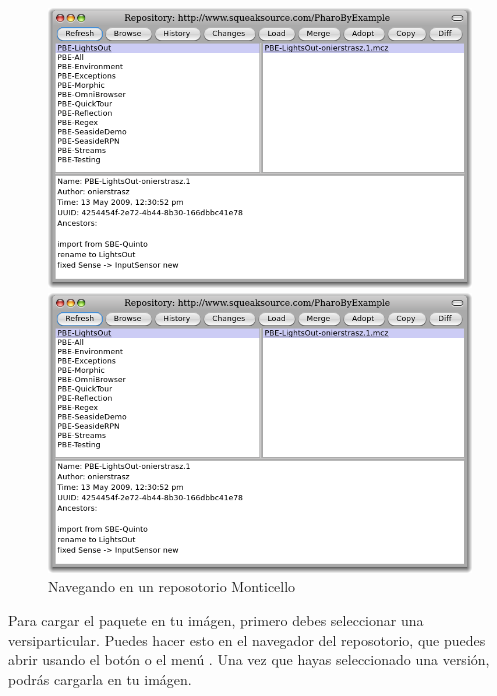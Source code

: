 \documentclass[a4paper,10pt,twoside]{book}
\begin{document}
\begin{figure}[hbt]
\ifluluelse
	{\centerline {\includegraphics[width=\textwidth]{BrowseRepository}}}
	{\centerline {\includegraphics[scale=0.7]{BrowseRepository}}}
\caption{Navegando en un reposotorio Monticello
}
\end{figure}


Para cargar el paquete en tu im\'agen, primero debes seleccionar una versi\on particular. Puedes hacer esto en el navegador del reposotorio, que puedes abrir usando el bot\'on  o el men\'u \actclick. Una vez que hayas seleccionado una versi\'on, podr\'as cargarla en tu im\'agen.
\end{document}
